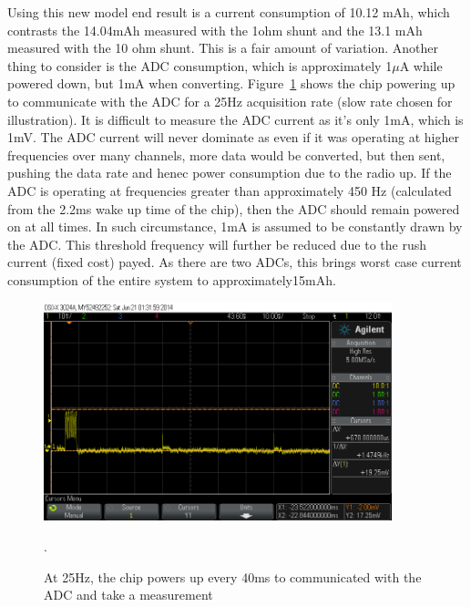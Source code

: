 \documentclass[]{article}
\begin{document}
Using this new model end result is a current consumption of 10.12 mAh, which contrasts the 14.04mAh measured with the 1ohm shunt and the 13.1 mAh measured with the 10 ohm shunt. This is a fair amount of variation. Another thing to consider is the \ac{ADC} consumption, which is approximately 1$\mu$A while powered down, but 1mA when converting. Figure~\ref{fig:adcpower} shows the chip powering up to communicate with the \ac{ADC} for a 25Hz acquisition rate (slow rate chosen for illustration). It is difficult to measure the \ac{ADC} current as it's only 1mA, which is 1mV. The \ac{ADC} current will never dominate as even if it was operating at higher frequencies over many channels, more data would be converted, but then sent, pushing the data rate and henec power consumption due to the radio up. If the \ac{ADC} is operating at frequencies greater than approximately 450 Hz (calculated from the 2.2ms wake up time of the chip), then the \ac{ADC} should remain powered on at all times. In such circumstance, 1mA is assumed to be constantly drawn by the \ac{ADC}. This threshold frequency will further be reduced due to the rush current (fixed cost) payed. As there are two \ac{ADC}s, this brings worst case current consumption of the entire system to approximately15mAh.

\begin{figure}[H]
	\begin{center}
		\includegraphics[width = 0.9\textwidth]{adcpower}
	\end{center}
	\caption{At 25Hz, the chip powers up every 40ms to communicated with the \ac{ADC} and take a measurement}. 
	\label{fig:adcpower}
\end{figure}

\end{document}
